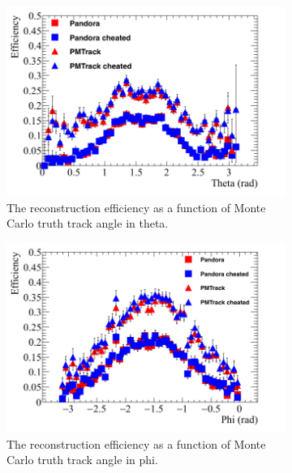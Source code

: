 \begin{figure}[h!]
\begin{subfigure}{0.48\textwidth}
        \centering
        \includegraphics[width=\textwidth]{Effic_ProtonEnrich_500V_Proton_Theta}
        \caption{The reconstruction efficiency as a function of Monte Carlo truth track angle in theta.}
        \label{fig:Prot_Effic_Theta}
  \end{subfigure}%
  \hspace{0.03\textwidth}%
  \begin{subfigure}{0.48\textwidth}
        \centering
        \includegraphics[width=\textwidth]{Effic_ProtonEnrich_500V_Proton_Phi}
        \caption{The reconstruction efficiency as a function of Monte Carlo truth track angle in phi.}
        \label{fig:Prot_Effic_Phi}
  \end{subfigure}
  \begin{subfigure}{0.8\textwidth}
        \centering

\end{subfigure}
\end{figure}
